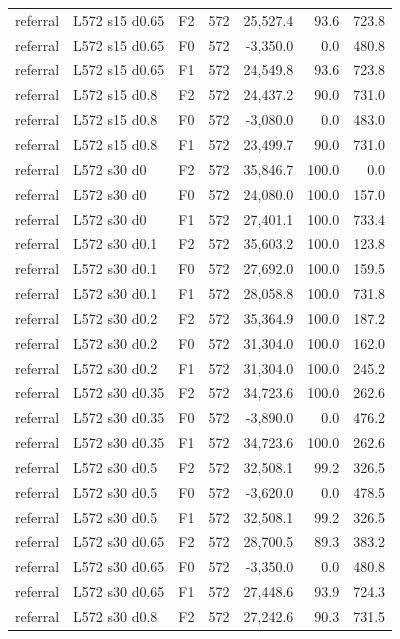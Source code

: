 \begin{longtable}{p{1.8cm}p{3.35cm}lrrrr}
referral & L572 s15 d0.65 & F2 & 572 & 25,527.4 & 93.6 & 723.8\\
referral & L572 s15 d0.65 & F0 & 572 & -3,350.0 & 0.0 & 480.8\\
referral & L572 s15 d0.65 & F1 & 572 & 24,549.8 & 93.6 & 723.8\\
referral & L572 s15 d0.8 & F2 & 572 & 24,437.2 & 90.0 & 731.0\\
referral & L572 s15 d0.8 & F0 & 572 & -3,080.0 & 0.0 & 483.0\\
referral & L572 s15 d0.8 & F1 & 572 & 23,499.7 & 90.0 & 731.0\\
referral & L572 s30 d0 & F2 & 572 & 35,846.7 & 100.0 & 0.0\\
referral & L572 s30 d0 & F0 & 572 & 24,080.0 & 100.0 & 157.0\\
referral & L572 s30 d0 & F1 & 572 & 27,401.1 & 100.0 & 733.4\\
referral & L572 s30 d0.1 & F2 & 572 & 35,603.2 & 100.0 & 123.8\\
referral & L572 s30 d0.1 & F0 & 572 & 27,692.0 & 100.0 & 159.5\\
referral & L572 s30 d0.1 & F1 & 572 & 28,058.8 & 100.0 & 731.8\\
referral & L572 s30 d0.2 & F2 & 572 & 35,364.9 & 100.0 & 187.2\\
referral & L572 s30 d0.2 & F0 & 572 & 31,304.0 & 100.0 & 162.0\\
referral & L572 s30 d0.2 & F1 & 572 & 31,304.0 & 100.0 & 245.2\\
referral & L572 s30 d0.35 & F2 & 572 & 34,723.6 & 100.0 & 262.6\\
referral & L572 s30 d0.35 & F0 & 572 & -3,890.0 & 0.0 & 476.2\\
referral & L572 s30 d0.35 & F1 & 572 & 34,723.6 & 100.0 & 262.6\\
referral & L572 s30 d0.5 & F2 & 572 & 32,508.1 & 99.2 & 326.5\\
referral & L572 s30 d0.5 & F0 & 572 & -3,620.0 & 0.0 & 478.5\\
referral & L572 s30 d0.5 & F1 & 572 & 32,508.1 & 99.2 & 326.5\\
referral & L572 s30 d0.65 & F2 & 572 & 28,700.5 & 89.3 & 383.2\\
referral & L572 s30 d0.65 & F0 & 572 & -3,350.0 & 0.0 & 480.8\\
referral & L572 s30 d0.65 & F1 & 572 & 27,448.6 & 93.9 & 724.3\\
referral & L572 s30 d0.8 & F2 & 572 & 27,242.6 & 90.3 & 731.5\\

\end{longtable}
